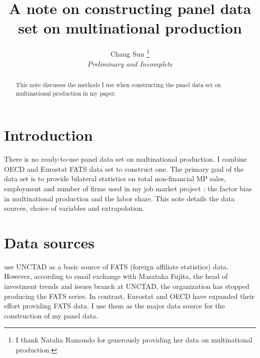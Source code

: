 \documentclass[notitlepage,11pt]{article}%
\begin{document}
\title{A note on constructing panel data set on multinational production}
\author{Chang Sun%
\thanks
{I thank Natalia Ramondo for generously providing her data on multinational production.}%
\\\emph{Preliminary and Incomplete}}
\maketitle

\begin{abstract}
This note discusses the methods I use when constructing the panel data set on
multinational production in my paper.

\end{abstract}

\section{Introduction}

There is no ready-to-use panel data set on multinational production. I combine
OECD and Eurostat FATS data set to construct one. The primary goal of the data
set is to provide bilateral statistics on total non-financial MP sales,
employment and number of firms used in my job market project : the factor bias
in multinational production and the labor share. This note details the data
sources, choice of variables and extrapolation.%

%






\appendix{}

\section{Data sources}

\cite{ramondo_multinational_2015} use UNCTAD as a basic source of FATS
(foreign affiliate statistics) data. However, according to email exchange with
Masataka Fujita, the head of investment trends and issues branch at UNCTAD,
the organization has stopped producing the FATS series. In contrast, Eurostat
and OECD have expanded their effort providing FATS data. I use them as the
major data source for the construction of my panel data.
\end{document}
